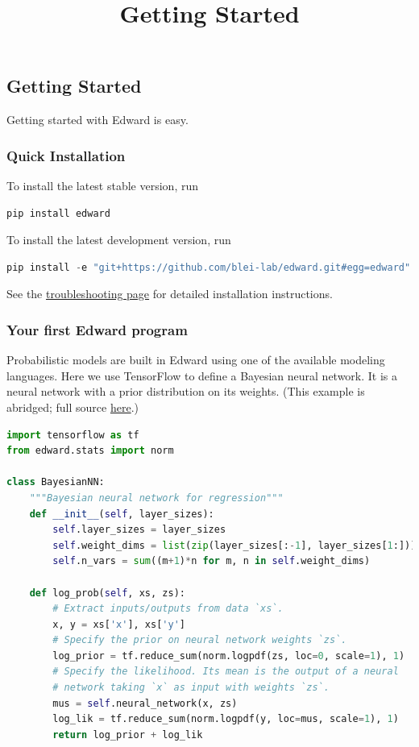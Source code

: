 \title{Getting Started}

\subsection{Getting Started}
Getting started with Edward is easy.

\subsubsection{Quick Installation}
To install the latest stable version, run

\begin{lstlisting}[language=Java]
pip install edward
\end{lstlisting}

To install the latest development version, run

\begin{lstlisting}[language=Java]
pip install -e "git+https://github.com/blei-lab/edward.git#egg=edward"
\end{lstlisting}

See the \href{troubleshooting.html}{troubleshooting page} for detailed
installation instructions.


\subsubsection{Your first Edward program}

Probabilistic models are built in Edward using one of the available
modeling languages. Here we use TensorFlow to define a Bayesian neural
network. It is a neural network with a prior distribution on its
weights.
(This example is abridged; full source
\href{https://github.com/blei-lab/edward/blob/master/examples/getting_started_example.py}
{here}.)
\begin{lstlisting}[language=Python]
import tensorflow as tf
from edward.stats import norm

class BayesianNN:
    """Bayesian neural network for regression"""
    def __init__(self, layer_sizes):
        self.layer_sizes = layer_sizes
        self.weight_dims = list(zip(layer_sizes[:-1], layer_sizes[1:]))
        self.n_vars = sum((m+1)*n for m, n in self.weight_dims)

    def log_prob(self, xs, zs):
        # Extract inputs/outputs from data `xs`.
        x, y = xs['x'], xs['y']
        # Specify the prior on neural network weights `zs`.
        log_prior = tf.reduce_sum(norm.logpdf(zs, loc=0, scale=1), 1)
        # Specify the likelihood. Its mean is the output of a neural
        # network taking `x` as input with weights `zs`.
        mus = self.neural_network(x, zs)
        log_lik = tf.reduce_sum(norm.logpdf(y, loc=mus, scale=1), 1)
        return log_prior + log_lik
\end{lstlisting}

